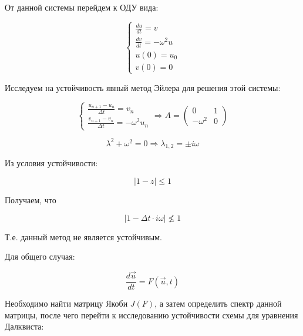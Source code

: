 \documentclass[10pt,a4paper]{article}
\begin{document}
	От данной системы перейдем к ОДУ вида:
	
	\begin{equation}
		\begin{cases}
			\frac{du}{dt} = v
			\\
			\frac{dv}{dt} = -\omega^{2}u
			\\
			u\left(0\right) = u_{0}
			\\
			v\left(0\right) = 0
		\end{cases}
	\end{equation}
	
	Исследуем на устойчивость явный метод Эйлера для решения этой системы:
	
	\begin{equation}
		\begin{cases}
			\frac{u_{n + 1} - u_{n}}{\Delta t} = v_{n}
			\\
			\frac{v_{n + 1} - v_{n}}{\Delta t} = -\omega^{2}u_{n}
		\end{cases} \Rightarrow A = \begin{pmatrix}
			0	&	 1 \\
			-\omega^{2} & 0
		\end{pmatrix}
	\end{equation}
	
	\begin{equation}
		\lambda^{2} + \omega^{2} = 0 \Rightarrow \lambda_{1,2} = \pm i\omega
	\end{equation}
	
	Из условия устойчивости:
	
	\begin{equation}
		\left|1 - z\right| \leqslant 1
	\end{equation}
	
	Получаем, что 
	
	\begin{equation}
		\left|1 - \Delta t\cdot i\omega\right| \nleqslant 1
	\end{equation}
	
	Т.е. данный метод не является устойчивым.
	
	Для общего случая:
	
	\begin{equation}
		\frac{d\vec{u}}{dt} = F\left(\vec{u}, t\right)
	\end{equation}
	
	Необходимо найти матрицу Якоби $J\left(F\right)$, а затем определить спектр
	данной матрицы, после чего перейти к исследованию устойчивости схемы для 
	уравнения Далквиста:
	
\end{document}
